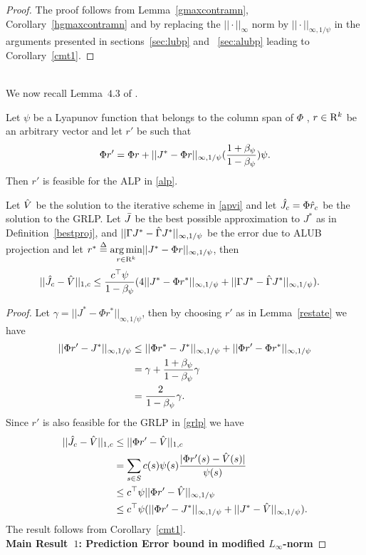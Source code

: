 \documentclass[12pt,draftcls,onecolumn]{IEEEtran}
\begin{document}
\begin{proof}
The proof follows from Lemma~\ref{gmaxcontramn}, Corollary~\ref{hgmaxcontramn} and by replacing the $||\cdot||_\infty$ norm by $||\cdot||_{\infty,1/\psi}$ in the arguments presented in sections~\ref{sec:lubp} and ~\ref{sec:alubp} leading to Corollary~\ref{cmt1}.
\end{proof}\\
We now recall Lemma~$4.3$ of \cite{ALP}.
\begin{lemma}\label{restate}
Let $\psi$ be a Lyapunov function that belongs to the column span of $\Phi$ , $r \in \mathrm{R}^k$ be an arbitrary vector and let $r'$ be such that
\begin{align}
\Phi r'=\Phi r+||J^*-\Phi r||_{\infty,1/\psi}(\frac{1+\beta_{\psi}}{1-\beta_{\psi}})\psi.
\end{align}
Then $r'$ is feasible for the ALP in \eqref{alp}.
\end{lemma}
\begin{theorem}\label{mt2mn}
Let $\hat{V}$ be the solution to the iterative scheme in \eqref{apvi} and let $\hat{J}_c=\Phi \hat{r}_c$ be the solution to the GRLP. Let $\bar{J}$ be the best possible approximation to $J^*$ as in Definition~\ref{bestproj}, and $||\Gamma J^* -\hat{\Gamma} J^*||_{\infty,1/\psi}$ be the error due to ALUB projection and let $r^*\stackrel{\Delta}{=}\underset{r\in \mathrm{R}^k}{\arg\min}||J^*-\Phi r||_{\infty,1/\psi}$, then
\begin{align}
||\hat{J}_c-\hat{V}||_{1,c}&\leq \frac{c^\top \psi}{1-\beta_\psi}(4||J^*-\Phi r^*||_{\infty,1/\psi}
+||\Gamma J^*-\hat{\Gamma} J^*||_{\infty,1/\psi}).
\end{align}
\end{theorem}
\begin{proof}
Let $\gamma=||J^*-\Phi r^*||_{\infty,1/\psi}$, then by choosing $r'$ as in Lemma~\ref{restate} we have
\begin{align}
||\Phi r'-J^*||_{\infty,1/\psi}&\leq ||\Phi r^*-J^*||_{\infty,1/\psi}+||\Phi r'-\Phi r^*||_{\infty,1/\psi}\nonumber\\
&=\gamma+\frac{1+\beta_\psi}{1-\beta_\psi}\gamma\nonumber\\
&=\frac{2}{1-\beta_\psi}\gamma.\nonumber
\end{align}
Since $r'$ is also feasible for the GRLP in \eqref{grlp} we have
\begin{align}
||\hat{J}_c-\hat{V}||_{1,c}&\leq||\Phi r'-\hat{V}||_{1,c}\nonumber\\
&=\sum_{s\in S}c(s)\psi(s)\frac{|\Phi r'(s)-\hat{V}(s)|}{\psi(s)}\nonumber\\
&\leq c^\top \psi ||\Phi r'-\hat{V}||_{\infty,1/\psi}\nonumber\\
&\leq c^\top \psi (||\Phi r'-J^*||_{\infty,1/\psi}+||J^*-\hat{V}||_{\infty,1/\psi}).
\end{align}
The result follows from Corollary~\ref{cmt1}.\\
\textbf{Main Result~$1$: Prediction Error bound in modified $L_\infty$-norm}
\end{proof}
\end{document}
